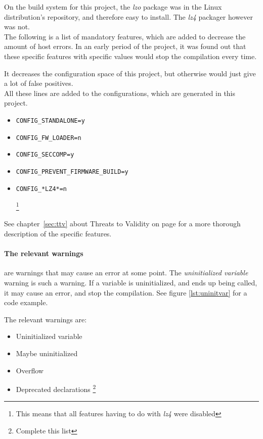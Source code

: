 \documentclass[a4paper,11pt]{report}
\newcommand{\textcode}[1]{
    \fboxsep=1pt
    \texttt{\colorbox{gray!20}{#1}}
}
\begin{document}
On the build system for this project, the \emph{lzo} package was in the Linux 
distribution's repository, and therefore easy to install. The \emph{lz4} 
packager however was not.
\\

The following is a list of mandatory features, which are added to decrease the 
amount of host errors. In an early period of the project, it was found out that 
these specific features with specific values would stop the compilation every 
time.

It decreases the configuration space of this project, but otherwise 
would just give a lot of false positives.
\\

All these lines are added to the configurations, which are generated in
this project.

\begin{itemize}
    \item \textcode{CONFIG\_STANDALONE=y}
    \item \textcode{CONFIG\_FW\_LOADER=n}
    \item \textcode{CONFIG\_SECCOMP=y}
    \item \textcode{CONFIG\_PREVENT\_FIRMWARE\_BUILD=y}
    \item \textcode{CONFIG\_*LZ4*=n}
        \footnote{This means that all features having to do with \emph{lz4} 
                    were disabled}
\end{itemize}

See chapter~\ref{sec:ttv} about Threats to Validity on page \pageref{sec:ttv} 
for a more thorough description of the specific features.


    \paragraph{The relevant warnings}
are warnings that may cause an error at some point. The \emph{uninitialized 
variable} warning is such a warning. If a variable is uninitialized, and ends 
up being called, it may cause an error, and stop the compilation. See figure 
\ref{lst:uninitvar} for a code example.

The relevant warnings are:

\begin{itemize}
    \item Uninitialized variable
    \item Maybe uninitialized
    \item Overflow
    \item Deprecated declarations
        \footnote{Complete this list}
\end{itemize}
\end{document}
